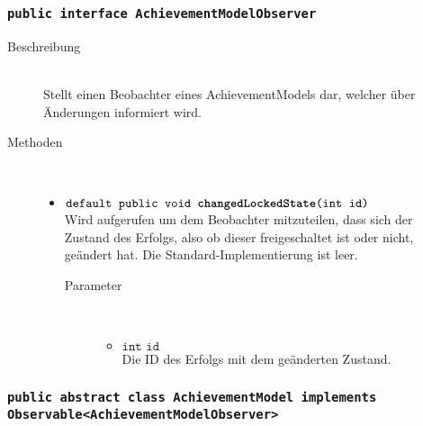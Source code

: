 		
		\subsubsection{\normalfont \texttt{public interface \textbf{AchievementModelObserver}}}
		
		\begin{description}
		\item[Beschreibung] \hfill \\ Stellt einen Beobachter eines AchievementModels dar, welcher über Änderungen informiert wird.
		
		\item[Methoden] \hfill \\
			\vspace{-.8cm}
			\begin{itemize}
				\item $\texttt{default public void \textbf{changedLockedState}(int id)}$ \\ Wird aufgerufen um dem Beobachter mitzuteilen, dass sich der Zustand des Erfolgs, also ob dieser freigeschaltet ist oder nicht, geändert hat. Die Standard-Implementierung ist leer.
					\begin{description}
					\item[Parameter] \hfill \\
					\vspace{-.8cm}
					\begin{itemize}
						\item $\texttt{int id}$ \\ Die ID des Erfolgs mit dem geänderten Zustand.
					\end{itemize}
					\end{description}
			\end{itemize}
		\end{description}
		
		\subsubsection{\normalfont \texttt{public abstract class \textbf{AchievementModel} implements Observable<AchievementModelObserver>}}
		

